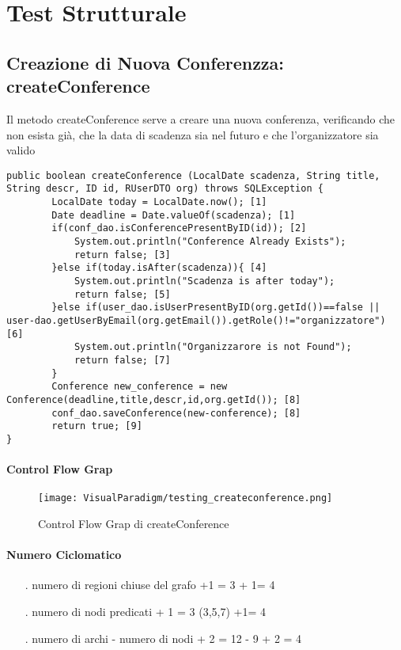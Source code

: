 \section{Test Strutturale}
\label{sec:test_strutturale}

\subsection{Creazione di Nuova Conferenzza: createConference}
Il metodo createConference serve a creare una nuova conferenza, verificando che non esista già, che la data di scadenza sia nel futuro e che l'organizzatore sia valido
\begin{lstlisting}
public boolean createConference (LocalDate scadenza, String title, String descr, ID id, RUserDTO org) throws SQLException { 
        LocalDate today = LocalDate.now(); [1]
        Date deadline = Date.valueOf(scadenza); [1]
        if(conf_dao.isConferencePresentByID(id)); [2]
            System.out.println("Conference Already Exists");
            return false; [3]
        }else if(today.isAfter(scadenza)){ [4]
            System.out.println("Scadenza is after today");
            return false; [5]
        }else if(user_dao.isUserPresentByID(org.getId())==false || user-dao.getUserByEmail(org.getEmail()).getRole()!="organizzatore") [6]
            System.out.println("Organizzarore is not Found");
            return false; [7]
        }
        Conference new_conference = new Conference(deadline,title,descr,id,org.getId()); [8]
        conf_dao.saveConference(new-conference); [8]
        return true; [9]
}
\end{lstlisting}
\paragraph{Control Flow Grap}
\begin{figure}[ht]
  \centering
  \texttt{[image: VisualParadigm/testing\_createconference.png]}
  \caption{Control Flow Grap di createConference}
  \label{fig:cfg_create_conference }
\end{figure}
\paragraph{Numero Ciclomatico}
\begin{itemize}
\item[.] numero di regioni chiuse del grafo +1 = 3 + 1= 4 
\item[.] numero di nodi predicati + 1 = 3 (3,5,7) +1= 4
\item[.] numero di archi - numero di nodi + 2 = 12 - 9 + 2 = 4 
\end{itemize}
